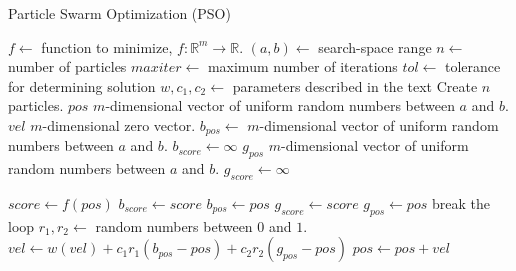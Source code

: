 \begin{algorithm}[!h]
    \caption{Particle Swarm Optimization (PSO)}
    \label{alg:pso}
    \begin{algorithmic}[1]
        \Statex $f \gets$ function to minimize, $f: \mathbb{R}^{m} \rightarrow \mathbb{R}$.
        \Statex $(a, b) \gets$ search-space range
        \Statex $n \gets$ number of particles
        \Statex $maxiter \gets$ maximum number of iterations
        \Statex $tol \gets$ tolerance for determining solution
        \Statex $w, c_{1}, c_{2} \gets$ parameters described in the text
        \State Create $n$ particles.
            \State $pos$ $m$-dimensional vector of uniform random numbers between $a$ and $b$.
            \State $vel$ $m$-dimensional zero vector.
            \State $b_{pos} \gets$ $m$-dimensional vector of uniform random numbers between $a$ and $b$.
            \State $b_{score} \gets \infty$
        \EndFor
        \State $g_{pos}$ $m$-dimensional vector of uniform random numbers between $a$ and $b$.
        \State $g_{score} \gets \infty$

                \State $score \gets f(pos)$ 
                    \State $b_{score} \gets score$
                    \State $b_{pos} \gets pos$
                \EndIf
                    \State $g_{score} \gets score$
                    \State $g_{pos} \gets pos$
                \EndIf
            \EndFor
                \State break the loop
            \EndIf
                \State $r_{1}, r_{2} \gets$ random numbers between $0$ and $1$.
                \State $vel \gets w(vel) + c_{1}r_{1}(b_{pos}-pos) + c_{2}r_{2}(g_{pos}-pos)$
                \State $pos \gets pos + vel$
            \EndFor
        \EndFor
    \end{algorithmic}
\end{algorithm}

